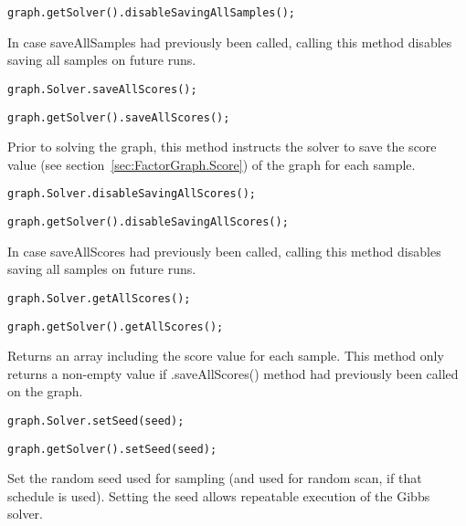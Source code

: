 \ifjava
\begin{lstlisting}
graph.getSolver().disableSavingAllSamples();
\end{lstlisting}
\fi

In case saveAllSamples had previously been called, calling this method disables saving all samples on future runs.

\ifmatlab
\begin{lstlisting}
graph.Solver.saveAllScores();
\end{lstlisting}
\fi

\ifjava
\begin{lstlisting}
graph.getSolver().saveAllScores();
\end{lstlisting}
\fi

Prior to solving the graph, this method instructs the solver to save the score value (see section~\ref{sec:FactorGraph.Score}) of the graph for each sample.

\ifmatlab
\begin{lstlisting}
graph.Solver.disableSavingAllScores();
\end{lstlisting}
\fi

\ifjava
\begin{lstlisting}
graph.getSolver().disableSavingAllScores();
\end{lstlisting}
\fi

In case saveAllScores had previously been called, calling this method disables saving all samples on future runs.

\ifmatlab
\begin{lstlisting}
graph.Solver.getAllScores();
\end{lstlisting}
\fi

\ifjava
\begin{lstlisting}
graph.getSolver().getAllScores();
\end{lstlisting}
\fi

Returns an array including the score value for each sample. This method only returns a non-empty value if .saveAllScores() method had previously been called on the graph.

\ifmatlab
\begin{lstlisting}
graph.Solver.setSeed(seed);
\end{lstlisting}
\fi

\ifjava
\begin{lstlisting}
graph.getSolver().setSeed(seed);
\end{lstlisting}
\fi

Set the random seed used for sampling (and used for random scan, if that schedule is used). Setting the seed allows repeatable execution of the Gibbs solver.

